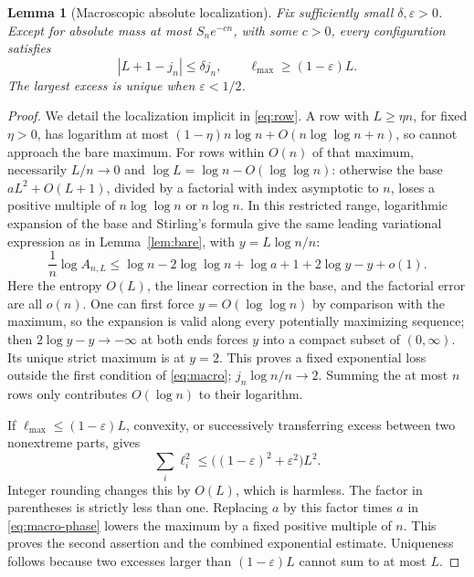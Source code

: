 \documentclass[11pt,a4paper]{article}
\numberwithin{equation}{section}
\newtheorem{lemma}[theorem]{Lemma}
\theoremstyle{definition}\newtheorem{definition}[theorem]{Definition}
\theoremstyle{remark}\newtheorem{remark}[theorem]{Remark}
\theoremstyle{definition}
\begin{document}
\begin{lemma}[Macroscopic absolute localization]
\label{lem:macro}
Fix sufficiently small \(\delta,\varepsilon>0\). Except for absolute mass
at most \(S_n e^{-c n}\), with some \(c>0\), every configuration satisfies
\begin{equation}
 |L+1-j_n|\le\delta j_n,\qquad
 \ell_{\max}\ge(1-\varepsilon)L.
 \label{eq:macro}
\end{equation}
The largest excess is unique when \(\varepsilon<1/2\).
\end{lemma}
\begin{proof}
We detail the localization implicit in \eqref{eq:row}. A row with
\(L\ge\eta n\), for fixed \(\eta>0\), has logarithm at most
\((1-\eta)n\log n+O(n\log\log n+n)\), so cannot approach the bare maximum.
For rows within \(O(n)\) of that maximum, necessarily \(L/n\to0\) and
\(\log L=\log n-O(\log\log n)\): otherwise the base
\(aL^2+O(L+1)\), divided by a factorial with index asymptotic to \(n\),
loses a positive multiple of \(n\log\log n\) or \(n\log n\).
In this restricted range, logarithmic expansion of the base and Stirling's
formula give the same leading variational expression as in
Lemma~\ref{lem:bare}, with \(y=L\log n/n\):
\begin{equation}
 \frac1n\log A_{n,L}
 \le\log n-2\log\log n+\log a+1+2\log y-y+o(1).
 \label{eq:macro-phase}
\end{equation}
Here the entropy \(O(L)\), the linear correction in the base, and the
factorial error are all \(o(n)\). One can first force
\(y=O(\log\log n)\) by comparison with the maximum, so the expansion is
valid along every potentially maximizing sequence; then
\(2\log y-y\to-\infty\) at both ends forces \(y\) into a compact
subset of \((0,\infty)\). Its unique strict maximum is at \(y=2\).
This proves a fixed exponential loss outside the first condition of
\eqref{eq:macro}; \(j_n\log n/n\to2\). Summing the at most \(n\) rows
only contributes \(O(\log n)\) to their logarithm.

If \(\ell_{\max}\le(1-\varepsilon)L\), convexity, or successively
transferring excess between two nonextreme parts, gives
\[
 \sum_i\ell_i^2\le\bigl((1-\varepsilon)^2+\varepsilon^2\bigr)L^2.
\]
Integer rounding changes this by \(O(L)\), which is harmless. The factor
in parentheses is strictly less than one. Replacing \(a\) by this factor
times \(a\) in \eqref{eq:macro-phase} lowers the maximum by a fixed
positive multiple of \(n\). This proves the second assertion and the
combined exponential estimate. Uniqueness follows because two excesses
larger than \((1-\varepsilon)L\) cannot sum to at most \(L\).
\end{proof}
\end{document}
